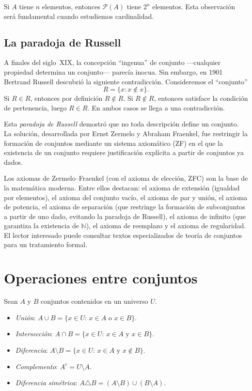 \begin{remark}
Si $A$ tiene $n$ elementos, entonces $\mathcal{P}(A)$ tiene $2^n$ elementos. Esta observación será fundamental cuando estudiemos cardinalidad.
\end{remark}

\subsection{La paradoja de Russell}

A finales del siglo~XIX, la concepción ``ingenua'' de conjunto ---cualquier propiedad determina un conjunto--- parecía inocua. Sin embargo, en 1901 Bertrand Russell descubrió la siguiente contradicción. Consideremos el ``conjunto''
\[
  R=\{x : x\notin x\}.
\]
Si $R\in R$, entonces por definición $R\notin R$. Si $R\notin R$, entonces satisface la condición de pertenencia, luego $R\in R$. En ambos casos se llega a una contradicción.

Esta \emph{paradoja de Russell} demostró que no toda descripción define un conjunto. La solución, desarrollada por Ernst Zermelo y Abraham Fraenkel, fue restringir la formación de conjuntos mediante un sistema axiomático (ZF) en el que la existencia de un conjunto requiere justificación explícita a partir de conjuntos ya dados.

\begin{remark}
Los axiomas de Zermelo--Fraenkel (con el axioma de elección, ZFC) son la base de la matemática moderna. Entre ellos destacan: el axioma de extensión (igualdad por elementos), el axioma del conjunto vacío, el axioma de par y unión, el axioma de potencia, el axioma de separación (que restringe la formación de subconjuntos a partir de uno dado, evitando la paradoja de Russell), el axioma de infinito (que garantiza la existencia de $\mathbb{N}$), el axioma de reemplazo y el axioma de regularidad. El lector interesado puede consultar textos especializados de teoría de conjuntos para un tratamiento formal.
\end{remark}

\section{Operaciones entre conjuntos}

\begin{definition}
\label{def:operaciones}
Sean $A$ y $B$ conjuntos contenidos en un universo $U$.
\begin{itemize}
  \item \emph{Unión}: $A\cup B=\{x\in U:\,x\in A\text{ o }x\in B\}$.
  \item \emph{Intersección}: $A\cap B=\{x\in U:\,x\in A\text{ y }x\in B\}$.
  \item \emph{Diferencia}: $A\setminus B=\{x\in U:\,x\in A\text{ y }x\notin B\}$.
  \item \emph{Complemento}: $A^c=U\setminus A$.
  \item \emph{Diferencia simétrica}: $A\triangle B=(A\setminus B)\cup(B\setminus A)$.
\end{itemize}
\end{definition}

